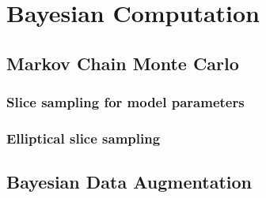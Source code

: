 \section{Bayesian Computation}
\label{sec:bayesian_computation}

\subsection{Markov Chain Monte Carlo}
\label{subsec:mcmc}

\subsubsection{Slice sampling for model parameters}
\label{subsubsec:slice_sampling}

\subsubsection{Elliptical slice sampling}
\label{subsubsec:elliptical_slice_sampling}

\subsection{Bayesian Data Augmentation}
\label{subsec:data_augmentation}
